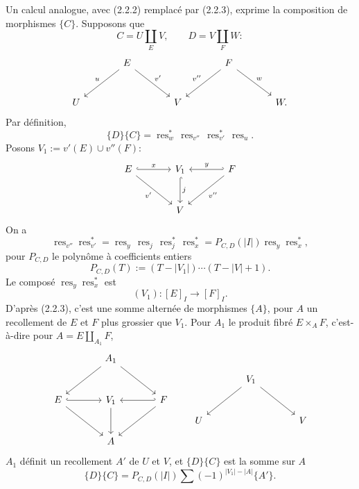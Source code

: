 \documentclass[11pt]{article}
\newcommand{\res}{\operatorname{res}}
\theoremstyle{deligne}
\newcommand{\para}[1]{\vspace{0.65em}\noindent{\bfseries #1}\quad}
\begin{document}
\para{Remarque 2.11.}
Un calcul analogue, avec (2.2.2) remplacé par (2.2.3), exprime la composition de morphismes \(\{C\}\). Supposons que
\[
  C=U\coprod_E V,\qquad D=V\coprod_F W:
\]
\[
\begin{tikzcd}[column sep=large,row sep=large]
& E \arrow[dl,"u"'] \arrow[dr,"v'"] &&
F \arrow[dl,"v''"'] \arrow[dr,"w"] &\\
U && V && W .
\end{tikzcd}
\]
Par définition,
\[
  \{D\}\{C\}=\res_w^*\,\res_{v''}\,\res_{v'}^*\,\res_u.
\]
Posons \(V_1:=v'(E)\cup v''(F)\):
\[
\begin{tikzcd}[column sep=large,row sep=large]
E \arrow[r,hook,"x"] \arrow[dr,"v'"'] &
V_1 \arrow[d,hook,"j"] &
F \arrow[l,hook',"y"'] \arrow[dl,"v''"]\\
& V &
\end{tikzcd}
\]
On a
\[
  \res_{v''}\res_{v'}^*
  =
  \res_y\,\res_j\,\res_j^*\,\res_x^*
  =
  P_{C,D}(|I|)\res_y\res_x^*,
\]
pour \(P_{C,D}\) le polynôme à coefficients entiers
\[
  P_{C,D}(T):=(T-|V_1|)\cdots(T-|V|+1).
  \tag{2.11.1}
\]
Le composé \(\res_y\res_x^*\) est
\[
  (V_1):[E]_I\longrightarrow[F]_I.
\]
D'après (2.2.3), c'est une somme alternée de morphismes \(\{A\}\), pour \(A\) un recollement de \(E\) et \(F\) plus grossier que \(V_1\). Pour \(A_1\) le produit fibré \(E\times_A F\), c'est-à-dire pour \(A=E\coprod_{A_1}F\),
\[
\begin{tikzcd}[column sep=large,row sep=large]
& A_1 \arrow[dl] \arrow[dr] &\\
E \arrow[r,hook] \arrow[dr] &
V_1 \arrow[d] &
F \arrow[l,hook'] \arrow[dl]\\
& A &
\end{tikzcd}
\qquad
\begin{tikzcd}[column sep=large,row sep=large]
& V_1 \arrow[dl] \arrow[dr] &\\
U && V
\end{tikzcd}
\]
\(A_1\) définit un recollement \(A'\) de \(U\) et \(V\), et \(\{D\}\{C\}\) est la somme sur \(A\)
\[
  \{D\}\{C\}
  =
  P_{C,D}(|I|)
  \sum (-1)^{|V_1|-|A|}\{A'\}.
  \tag{2.11.2}
\]
\end{document}
